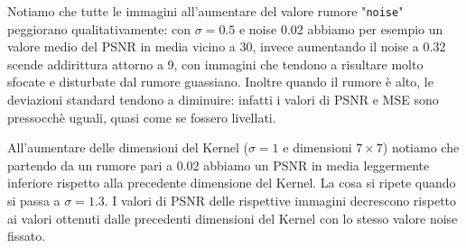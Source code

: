 Notiamo che tutte le immagini all'aumentare del valore rumore "\verb|noise|" peggiorano 
qualitativamente: 
con $\sigma = 0.5$ e noise 0.02 abbiamo per esempio un valore medio del PSNR in 
media vicino a 30, invece aumentando il noise a 0.32 scende addirittura attorno a 9, con 
immagini che tendono a risultare molto sfocate e disturbate dal rumore guassiano. 
Inoltre quando il rumore è alto, le deviazioni standard tendono a diminuire: 
infatti i valori di PSNR e MSE sono pressocchè uguali, quasi come se fossero livellati. 

All'aumentare delle dimensioni del Kernel ($\sigma = 1$ e dimensioni $7 \times 7$) notiamo che partendo 
da un rumore pari a 0.02 abbiamo un PSNR in media leggermente inferiore rispetto alla precedente 
dimensione del Kernel.
La cosa si ripete quando si passa a $\sigma = 1.3$.
I valori di PSNR delle rispettive immagini decrescono 
rispetto ai valori ottenuti dalle precedenti dimensioni del Kernel con lo stesso valore noise fissato.